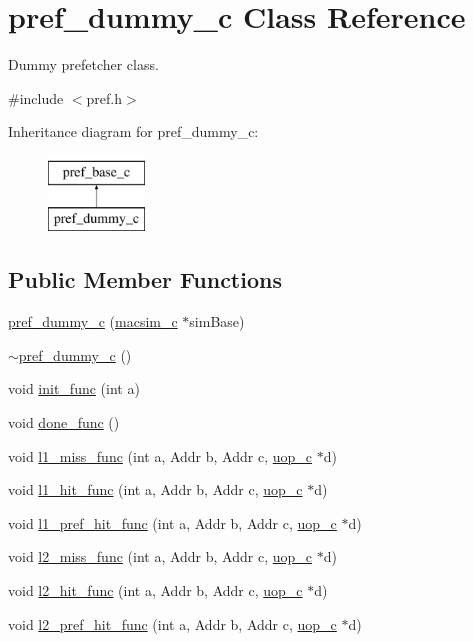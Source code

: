 \hypertarget{classpref__dummy__c}{
\section{pref\_\-dummy\_\-c Class Reference}
\label{classpref__dummy__c}
}


Dummy prefetcher class.  




{\ttfamily \#include $<$pref.h$>$}

Inheritance diagram for pref\_\-dummy\_\-c:\begin{figure}[H]
\begin{center}
\leavevmode
\includegraphics[height=2.000000cm]{classpref__dummy__c}
\end{center}
\end{figure}
\subsection*{Public Member Functions}
\begin{DoxyCompactItemize}
\item 
\hyperlink{classpref__dummy__c_a2c5d6804fd5ed823991bda4fe5fb3531}{pref\_\-dummy\_\-c} (\hyperlink{classmacsim__c}{macsim\_\-c} $\ast$simBase)
\item 
\hyperlink{classpref__dummy__c_abad511b20db2326cf78296d43b5315fc}{$\sim$pref\_\-dummy\_\-c} ()
\item 
void \hyperlink{classpref__dummy__c_a369a5b5a5f05dc63781ddb9551f8a6ae}{init\_\-func} (int a)
\item 
void \hyperlink{classpref__dummy__c_ac77e468dcd3b9bf7769acfb46a9e53b6}{done\_\-func} ()
\item 
void \hyperlink{classpref__dummy__c_a3ec5ae0af4500c1995fcaff75d2ed19e}{l1\_\-miss\_\-func} (int a, Addr b, Addr c, \hyperlink{classuop__c}{uop\_\-c} $\ast$d)
\item 
void \hyperlink{classpref__dummy__c_a48e578d6907b986e25b4abb59bca62f3}{l1\_\-hit\_\-func} (int a, Addr b, Addr c, \hyperlink{classuop__c}{uop\_\-c} $\ast$d)
\item 
void \hyperlink{classpref__dummy__c_ab3c2f14fdfaaa9d3e83c73ae1b2a461e}{l1\_\-pref\_\-hit\_\-func} (int a, Addr b, Addr c, \hyperlink{classuop__c}{uop\_\-c} $\ast$d)
\item 
void \hyperlink{classpref__dummy__c_a37f2c774aa8e532b6a285a14d4906c78}{l2\_\-miss\_\-func} (int a, Addr b, Addr c, \hyperlink{classuop__c}{uop\_\-c} $\ast$d)
\item 
void \hyperlink{classpref__dummy__c_a6c17bd9a59c598c78928d0f0b6a7ca59}{l2\_\-hit\_\-func} (int a, Addr b, Addr c, \hyperlink{classuop__c}{uop\_\-c} $\ast$d)
\item 
void \hyperlink{classpref__dummy__c_abb864a062e8c7a489eb5edb227b3f543}{l2\_\-pref\_\-hit\_\-func} (int a, Addr b, Addr c, \hyperlink{classuop__c}{uop\_\-c} $\ast$d)
\end{DoxyCompactItemize}


